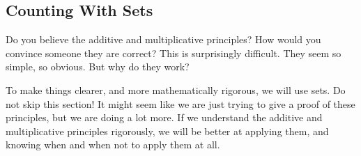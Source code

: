 \documentclass[10pt,]{book}
\theoremstyle{plain}
\theoremstyle{definition}
\theoremstyle{definition}
\theoremstyle{definition}
\numberwithin{equation}{chapter}
\begin{document}
\subsection[Counting With Sets]{Counting With Sets}\label{subsec_countingWithSets}

      Do you believe the additive and multiplicative principles? How would you convince someone they are correct? This is surprisingly difficult. They seem so simple, so obvious. But why do they work?
\par

      To make things clearer, and more mathematically rigorous, we will use sets. Do not skip this section! It might seem like we are just trying to give a proof of these principles, but we are doing a lot more. If we understand the additive and multiplicative principles rigorously, we will be better at applying them, and knowing when and when not to apply them at all.
\par
\end{document}
